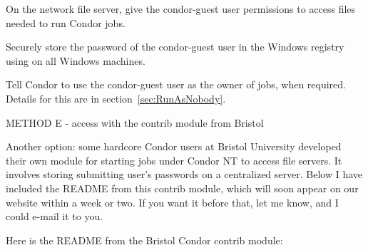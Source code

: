 On the network file server, give the condor-guest user permissions
to access files needed to run Condor jobs.

Securely store the password of the condor-guest user in the
Windows registry using  on all Windows
machines.

Tell Condor to use the condor-guest user as the owner of jobs,
when required.
Details for this are in 
section~\ref{sec:RunAsNobody}.

METHOD E -  access with the contrib module from Bristol

Another option: some hardcore Condor users at Bristol University developed 
their own module for starting jobs under Condor NT to access file 
servers.  It involves storing submitting user's passwords on a centralized 
server.  Below I have included the README from this contrib module, which 
will soon appear on our website within a week or two.  If you want it 
before that, let me know, and I could e-mail it to you.

Here is the README from the Bristol Condor contrib module:

